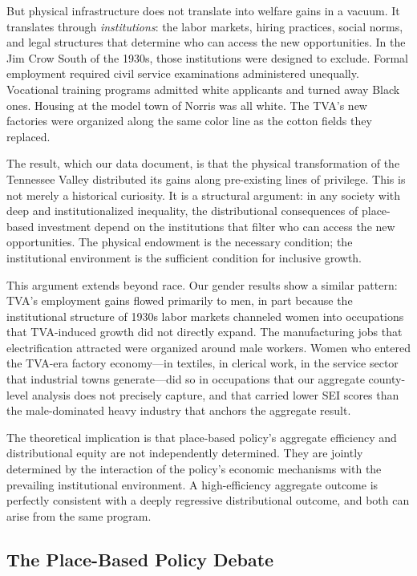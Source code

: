 \documentclass[12pt]{article}
\begin{document}
But physical infrastructure does not translate into welfare gains in a vacuum. It translates through \textit{institutions}: the labor markets, hiring practices, social norms, and legal structures that determine who can access the new opportunities. In the Jim Crow South of the 1930s, those institutions were designed to exclude. Formal employment required civil service examinations administered unequally. Vocational training programs admitted white applicants and turned away Black ones. Housing at the model town of Norris was all white. The TVA's new factories were organized along the same color line as the cotton fields they replaced.

The result, which our data document, is that the physical transformation of the Tennessee Valley distributed its gains along pre-existing lines of privilege. This is not merely a historical curiosity. It is a structural argument: in any society with deep and institutionalized inequality, the distributional consequences of place-based investment depend on the institutions that filter who can access the new opportunities. The physical endowment is the necessary condition; the institutional environment is the sufficient condition for inclusive growth.

This argument extends beyond race. Our gender results show a similar pattern: TVA's employment gains flowed primarily to men, in part because the institutional structure of 1930s labor markets channeled women into occupations that TVA-induced growth did not directly expand. The manufacturing jobs that electrification attracted were organized around male workers. Women who entered the TVA-era factory economy---in textiles, in clerical work, in the service sector that industrial towns generate---did so in occupations that our aggregate county-level analysis does not precisely capture, and that carried lower SEI scores than the male-dominated heavy industry that anchors the aggregate result.

The theoretical implication is that place-based policy's aggregate efficiency and distributional equity are not independently determined. They are jointly determined by the interaction of the policy's economic mechanisms with the prevailing institutional environment. A high-efficiency aggregate outcome is perfectly consistent with a deeply regressive distributional outcome, and both can arise from the same program.

\subsection{The Place-Based Policy Debate}
\end{document}
